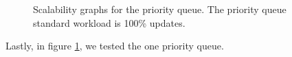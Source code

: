 \begin{figure}[tbp]
  \centering
  \caption{Scalability graphs for the priority queue.  The priority queue standard workload is 100\% updates.}
  \label{fig:priorityqueues}
\end{figure}

Lastly, in figure \ref{fig:priorityqueues}, we tested the one priority queue.

